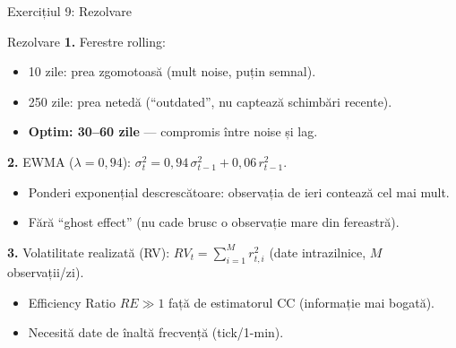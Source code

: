 \documentclass[9pt, aspectratio=169, t]{beamer}
\theoremstyle{definition}
\begin{document}
\begin{frame}{Exercițiul 9: Rezolvare}
\begin{block}{Rezolvare}
\textbf{1.} Ferestre rolling:
\begin{itemize}
\item 10 zile: prea zgomotoasă (mult noise, puțin semnal).
\item 250 zile: prea netedă (``outdated'', nu captează schimbări recente).
\item \textbf{Optim: 30--60 zile} — compromis între noise și lag.
\end{itemize}

\textbf{2.} EWMA ($\lambda = 0{,}94$): $\sigma_t^2 = 0{,}94\,\sigma_{t-1}^2 + 0{,}06\,r_{t-1}^2$.
\begin{itemize}
\item Ponderi exponențial descrescătoare: observația de ieri contează cel mai mult.
\item Fără ``ghost effect'' (nu cade brusc o observație mare din fereastră).
\end{itemize}

\textbf{3.} Volatilitate realizată (RV): $RV_t = \sum_{i=1}^{M} r_{t,i}^2$ (date intrazilnice, $M$ observații/zi).
\begin{itemize}
\item Efficiency Ratio $RE \gg 1$ față de estimatorul CC (informație mai bogată).
\item Necesită date de înaltă frecvență (tick/1-min).
\end{itemize}
\end{block}
\end{frame}
\end{document}
